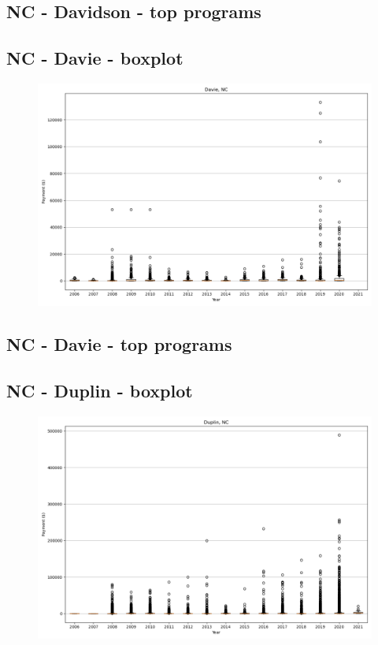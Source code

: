 \subsection*{NC - Davidson - top programs}

\newpage
\subsection*{NC - Davie - boxplot}
\begin{figure}[h]
\centering
\includegraphics[width=7in]{../output/boxplots/counties/Davie-NC_boxplot.png}
\end{figure}


\subsection*{NC - Davie - top programs}

\newpage
\subsection*{NC - Duplin - boxplot}
\begin{figure}[h]
\centering
\includegraphics[width=7in]{../output/boxplots/counties/Duplin-NC_boxplot.png}
\end{figure}


